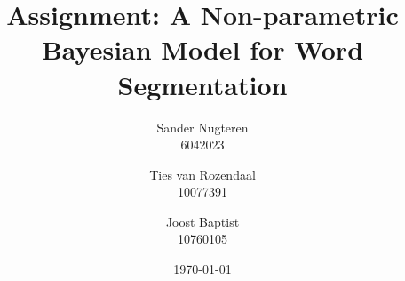\documentclass{article}
\title{Assignment: A Non-parametric Bayesian Model for Word Segmentation}
\author{Sander Nugteren\\ 6042023 \and Ties van Rozendaal\\ 10077391 \and Joost Baptist\\ 10760105}
\date{\today}
\begin{document}
\maketitle

\begin{multicols}{2}











\end{multicols}
\end{document}
